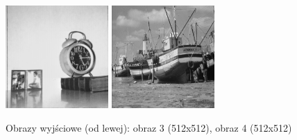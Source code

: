 \documentclass[final,a4paper,openany,12pt]{mwbk}
\begin{document}
\begin{figure}[H]
	\begin{center}
		\includegraphics[width=0.35\textwidth]{clock_gray_unificationRas_result}
		\includegraphics[width=0.35\textwidth]{boat_gray_unificationRas_result}
	\end{center}
	\caption{Obrazy wyjściowe (od lewej): obraz 3 (512x512), obraz 4 (512x512)}
\end{figure}

\end{document}
